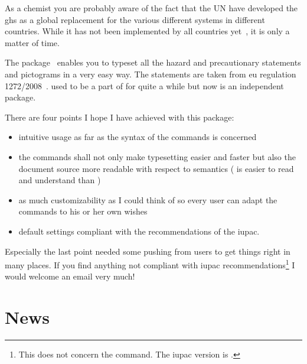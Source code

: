 \documentclass[load-preamble+]{cnltx-doc}
\begin{document}
As a chemist you are probably aware of the fact that the \acl{UN} have
developed the \ac{ghs} as a global replacement for the various different
systems in different countries.  While it has not been implemented by all
countries yet~\cite{unece:ghsystem_implementation}, it is only a matter of
time.

The package \ghsystem\ enables you to typeset all the hazard and precautionary
statements and pictograms in a very easy way.  The statements are taken from
\acs{eu} regulation 1272/2008~\cite{eu:ghsystem_regulation}.  \ghsystem{} used
to be a part of \chemmacros{} for quite a while but now is an independent
package.

There are four points I hope I have achieved with this package:
\begin{itemize}
  \item intuitive usage as far as the syntax of the commands is concerned
  \item the commands shall not only make typesetting easier and faster but also
    the document source more readable with respect to semantics
    ( is easier to read and understand than
    )
  \item as much customizability as I could think of so every user can adapt the
    commands to his or her own wishes
  \item default settings compliant with the recommendations of the \acf{iupac}.
\end{itemize}
Especially the last point needed some pushing from users to get things right
in many places.  If you find anything not compliant with \ac{iupac}
recommendations\footnote{This does not concern the  command. The
  \ac{iupac} version is \sarg.} I would welcome an email very much!

\section{News}\label{sec:news}
\end{document}
